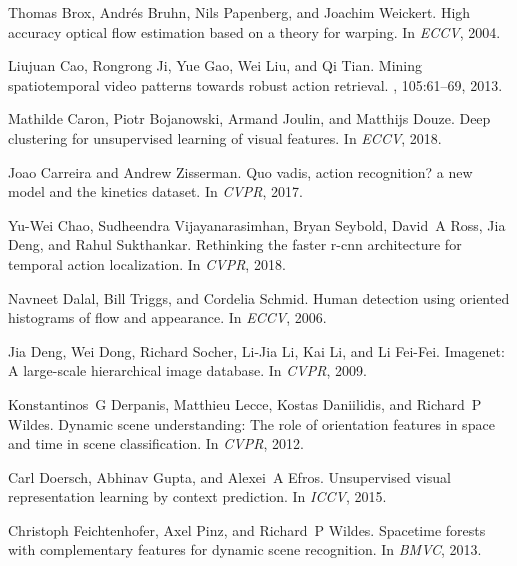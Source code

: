 \documentclass[10pt,twocolumn,letterpaper]{article}
\begin{document}
{\small
\begin{thebibliography}{10}\itemsep=-1pt

Thomas Brox, Andr{\'e}s Bruhn, Nils Papenberg, and Joachim Weickert.
\newblock High accuracy optical flow estimation based on a theory for warping.
\newblock In {\em ECCV}, 2004.

Liujuan Cao, Rongrong Ji, Yue Gao, Wei Liu, and Qi Tian.
\newblock Mining spatiotemporal video patterns towards robust action retrieval.
, 105:61--69, 2013.

Mathilde Caron, Piotr Bojanowski, Armand Joulin, and Matthijs Douze.
\newblock Deep clustering for unsupervised learning of visual features.
\newblock In {\em ECCV}, 2018.

Joao Carreira and Andrew Zisserman.
\newblock Quo vadis, action recognition? a new model and the kinetics dataset.
\newblock In {\em CVPR}, 2017.

Yu-Wei Chao, Sudheendra Vijayanarasimhan, Bryan Seybold, David~A Ross, Jia
  Deng, and Rahul Sukthankar.
\newblock Rethinking the faster r-cnn architecture for temporal action
  localization.
\newblock In {\em CVPR}, 2018.

Navneet Dalal, Bill Triggs, and Cordelia Schmid.
\newblock Human detection using oriented histograms of flow and appearance.
\newblock In {\em ECCV}, 2006.

Jia Deng, Wei Dong, Richard Socher, Li-Jia Li, Kai Li, and Li Fei-Fei.
\newblock Imagenet: A large-scale hierarchical image database.
\newblock In {\em CVPR}, 2009.

Konstantinos~G Derpanis, Matthieu Lecce, Kostas Daniilidis, and Richard~P
  Wildes.
\newblock Dynamic scene understanding: The role of orientation features in
  space and time in scene classification.
\newblock In {\em CVPR}, 2012.

Carl Doersch, Abhinav Gupta, and Alexei~A Efros.
\newblock Unsupervised visual representation learning by context prediction.
\newblock In {\em ICCV}, 2015.

Christoph Feichtenhofer, Axel Pinz, and Richard~P Wildes.
\newblock Spacetime forests with complementary features for dynamic scene
  recognition.
\newblock In {\em BMVC}, 2013.


\end{thebibliography}}
\end{document}
